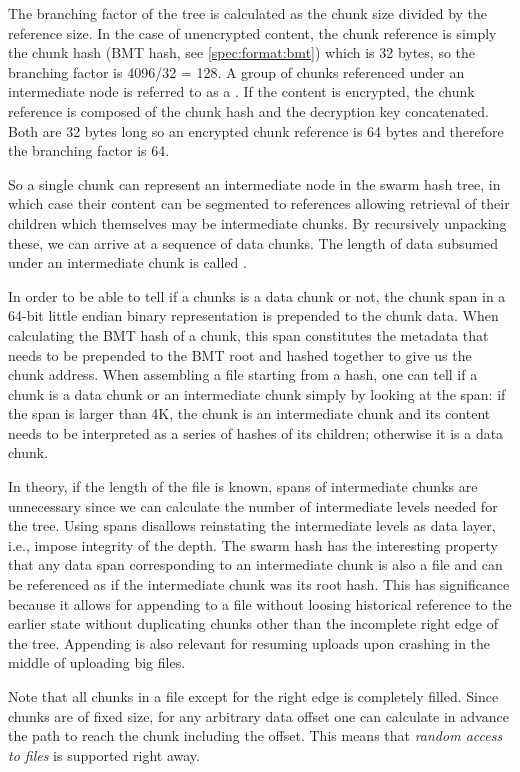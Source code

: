 The branching factor of the tree is calculated as the chunk size divided by the reference size. In the case of unencrypted content, the chunk reference is simply the chunk hash (BMT hash, see \ref{spec:format:bmt}) which is 32 bytes, so the branching factor is 4096/32 =  128. A group of chunks referenced under an intermediate node is referred to as a . If the content is encrypted, the chunk reference is  composed of the chunk hash and the decryption key concatenated. Both are 32 bytes long so an encrypted chunk reference is 64 bytes and therefore the branching factor is 64. 

So a single chunk can represent an intermediate node in the swarm hash tree, in which case their content can be segmented to references allowing retrieval of their children which themselves may be intermediate chunks. By recursively unpacking these, we can arrive at a sequence of data chunks. The length of data subsumed under an intermediate chunk is called .

In order to be able to tell if a chunks is a data chunk or not, the chunk span in a 64-bit little endian binary representation is prepended to the chunk data.  When calculating the BMT hash of a chunk, this span constitutes the metadata that needs to be prepended to the BMT root and hashed together to give us the chunk address. When assembling a file starting from a hash, one can tell if a chunk is a data chunk or an intermediate chunk simply by looking at the span: if the span is larger than 4K, the chunk is an intermediate chunk and its content needs to be interpreted as a series of hashes of its children; otherwise it is a data chunk.

In theory, if the length of the file is known, spans of intermediate chunks are unnecessary since we can calculate the number of intermediate levels needed for the tree. Using spans disallows reinstating the intermediate levels as data layer, i.e., impose  integrity of the depth. The swarm hash has the interesting property that any data span corresponding to an intermediate chunk is also a file and can be referenced as if the intermediate chunk was its root hash. This has significance because it allows for appending to a file without loosing historical reference to the earlier state without duplicating chunks other than the incomplete right edge of the tree. Appending is also relevant for resuming uploads upon crashing in the middle of uploading big files.

Note that all chunks in a file except for the right edge is completely filled. Since chunks are of fixed size, for any arbitrary data offset one can calculate in advance the path to reach the chunk including the offset. This means that \emph{random access to files} is  supported right away.   

